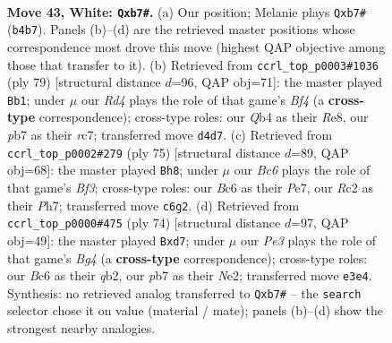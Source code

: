 \documentclass[11pt]{article}
\begin{document}
\clearpage

\begin{figure}[p]\centering
\begin{subfigure}{0.46\textwidth}\centering
\resizebox{\linewidth}{!}{%
\newchessgame
\chessboard[
  setfen={r7/kp4p1/p1B1npN1/8/1Q1R3p/4P1P1/PPR2P1P/7K w - - 5 43},
  showmover=false,
  pgfstyle=straightmove, color=movearrow, markmove={b4-b7}
]}
\caption{}
\end{subfigure}\hfill
\begin{subfigure}{0.46\textwidth}\centering
\resizebox{\linewidth}{!}{%
\newchessgame
\chessboard[
  setfen={3rr1k1/2Rn1p2/4P1p1/3P1b1p/3N3P/6P1/p4PB1/4R1K1 b - - 0 40},
  showmover=false,
  pgfstyle=straightmove, color=movearrow, markmove={f5-b1}
]}
\caption{}
\end{subfigure}
\\[4pt]
\begin{subfigure}{0.46\textwidth}\centering
\resizebox{\linewidth}{!}{%
\newchessgame
\chessboard[
  setfen={3r2k1/4p2p/4Rbp1/2pr2P1/1p3P2/2P2N1P/1P6/5RK1 b - - 0 38},
  showmover=false,
  pgfstyle=straightmove, color=movearrow, markmove={f6-h8}
]}
\caption{}
\end{subfigure}\hfill
\begin{subfigure}{0.46\textwidth}\centering
\resizebox{\linewidth}{!}{%
\newchessgame
\chessboard[
  setfen={5nk1/3r1pp1/p6p/3Qp3/4PPB1/6PP/1q2N2K/3R4 w - - 1 38},
  showmover=false,
  pgfstyle=straightmove, color=movearrow, markmove={g4-d7}
]}
\caption{}
\end{subfigure}
\caption{\textbf{Move 43, White: \texttt{Qxb7\#}.} (a) Our position; Melanie plays \texttt{Qxb7\#} (\texttt{b4b7}). Panels (b)--(d) are the retrieved master positions whose correspondence most drove this move (highest QAP objective among those that transfer to it). (b) Retrieved from \texttt{ccrl\_top\_p0003\#1036} (ply 79) [structural distance $d$=96, QAP obj=71]: the master played \texttt{Bb1}; under $\mu$ our \emph{Rd4} plays the role of that game's \emph{Bf4} (a \textbf{cross-type} correspondence); cross-type roles: our \emph{Q}b4 as their \emph{R}e8, our \emph{p}b7 as their \emph{r}c7; transferred move \texttt{d4d7}. (c) Retrieved from \texttt{ccrl\_top\_p0002\#279} (ply 75) [structural distance $d$=89, QAP obj=68]: the master played \texttt{Bh8}; under $\mu$ our \emph{Bc6} plays the role of that game's \emph{Bf3}; cross-type roles: our \emph{B}c6 as their \emph{P}e7, our \emph{R}c2 as their \emph{P}h7; transferred move \texttt{c6g2}. (d) Retrieved from \texttt{ccrl\_top\_p0000\#475} (ply 74) [structural distance $d$=97, QAP obj=49]: the master played \texttt{Bxd7}; under $\mu$ our \emph{Pe3} plays the role of that game's \emph{Bg4} (a \textbf{cross-type} correspondence); cross-type roles: our \emph{B}c6 as their \emph{q}b2, our \emph{p}b7 as their \emph{N}e2; transferred move \texttt{e3e4}. Synthesis: no retrieved analog transferred to \texttt{Qxb7\#} -- the \texttt{search} selector chose it on value (material / mate); panels (b)--(d) show the strongest nearby analogies.}
\label{fig:thought-m84}
\end{figure}
\end{document}
